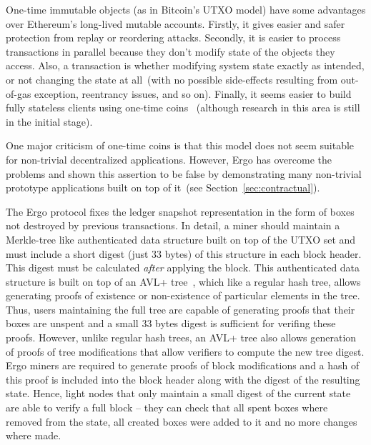 
One-time immutable objects (as in Bitcoin's UTXO model) have some advantages over Ethereum's long-lived mutable accounts.
Firstly, it gives easier and safer protection from replay or reordering attacks.
Secondly, it is easier to process transactions in parallel because they don't modify state of the objects they access.
Also, a transaction is whether modifying system state exactly as intended, or not changing the state at all~(with no
possible side-effects resulting from out-of-gas exception, reentrancy issues, and so on).
Finally, it seems easier to build fully stateless clients using one-time coins~\cite{chepurnoy2018edrax} (although research in this area is still in the initial stage).

One major criticism of one-time coins is that this model does not seem suitable for non-trivial decentralized applications. However, Ergo has overcome the problems and shown this assertion to be false by
demonstrating many non-trivial prototype applications built on top of
it~(see Section~\ref{sec:contractual}).

The Ergo protocol fixes the ledger snapshot representation in the form of boxes not destroyed by previous transactions.
In detail, a miner should maintain a Merkle-tree like authenticated data structure built on top of the UTXO set and must include a short digest (just 33 bytes) of this structure in each block header. This digest must be calculated {\em after} applying the block.
This authenticated data structure is built on top of an AVL+ tree~\cite{reyzin2017improving}, which like a regular hash tree,
allows generating proofs of existence or non-existence of particular elements in the tree.
Thus, users maintaining the full tree are capable of generating proofs that their boxes are unspent and a small 33 bytes digest is sufficient for verifing these proofs.
However, unlike regular hash trees, an AVL+ tree also allows generation of proofs of tree modifications that allow verifiers to compute the new tree digest.
Ergo miners are required to generate proofs of block modifications and a hash of this proof is included into the block header along with the digest of the resulting state.
Hence, light nodes that only maintain a small digest of the current state are able to verify a full block -- they can check that all spent boxes where
removed from the state, all created boxes were added to it and no more changes where made. 


